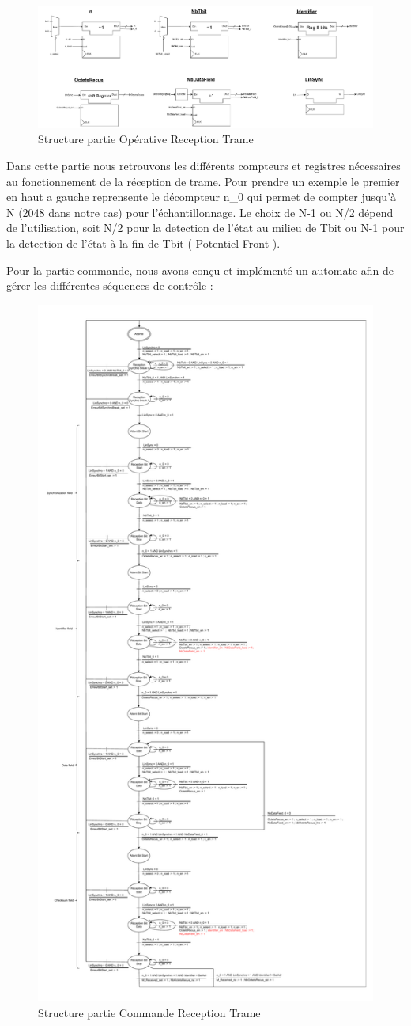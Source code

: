 \begin{figure}[H]
    \centering
    \includegraphics[width=0.8\linewidth]{images/inter/Structure_Reception_trame.pdf}
    \caption{Structure partie Opérative Reception Trame}
    \label{fig:placeholder}
\end{figure}

Dans cette partie nous retrouvons les différents compteurs et registres nécessaires au fonctionnement de la réception de trame. Pour prendre un exemple le premier en haut a gauche reprensente le décompteur n\_0 qui permet de compter jusqu'à N (2048 dans notre cas) pour l'échantillonnage. Le choix de N-1 ou N/2 dépend de l'utilisation, soit N/2 pour la detection de l'état au milieu de Tbit ou N-1 pour la detection de l'état à la fin de Tbit ( Potentiel Front ).
\newline

Pour la partie commande, nous avons conçu et implémenté un automate afin de gérer les différentes séquences de contrôle : 
\newline

\begin{figure}[H]
    \centering
    \includegraphics[width=0.6\linewidth]{images/inter/Automate_Reception_trame.pdf}
    \caption{Structure partie Commande Reception Trame}
    \label{fig:placeholder}
\end{figure}

